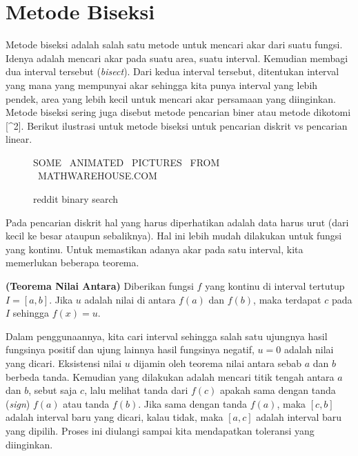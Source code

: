     \hypertarget{metode-biseksi}{%
\section{Metode Biseksi}\label{metode-biseksi}}

    Metode biseksi adalah salah satu metode untuk mencari akar dari suatu
fungsi. Idenya adalah mencari akar pada suatu area, suatu interval.
Kemudian membagi dua interval tersebut (\emph{bisect}). Dari kedua
interval tersebut, ditentukan interval yang mana yang mempunyai akar
sehingga kita punya interval yang lebih pendek, area yang lebih kecil
untuk mencari akar persamaan yang diinginkan. Metode biseksi sering juga
disebut metode pencarian biner atau metode dikotomi {[}\^{}2{]}. Berikut
ilustrasi untuk metode biseksi untuk pencarian diskrit vs pencarian
linear.

\begin{figure}
\centering
SOME \ ANIMATED \ PICTURES \ FROM \ MATHWAREHOUSE.COM
\caption{reddit binary search}
\end{figure}

Pada pencarian diskrit hal yang harus diperhatikan adalah data harus
urut (dari kecil ke besar ataupun sebaliknya). Hal ini lebih mudah
dilakukan untuk fungsi yang kontinu. Untuk memastikan adanya akar pada
satu interval, kita memerlukan beberapa teorema.

\noindent \textbf{(Teorema Nilai Antara)} Diberikan fungsi \(f\) yang kontinu di
interval tertutup \(I=[a,b]\). Jika \(u\) adalah nilai di antara
\(f(a)\) dan \(f(b)\), maka terdapat \(c\) pada \(I\) sehingga
\(f(x) = u\).




Dalam penggunaannya, kita cari interval sehingga salah satu ujungnya
hasil fungsinya positif dan ujung lainnya hasil fungsinya negatif,
\(u=0\) adalah nilai yang dicari. Eksistensi nilai \(u\) dijamin oleh
teorema nilai antara sebab \(a\) dan \(b\) berbeda tanda. Kemudian yang
dilakukan adalah mencari titik tengah antara \(a\) dan \(b\), sebut saja
\(c\), lalu melihat tanda dari \(f(c)\) apakah sama dengan tanda
(\emph{sign}) \(f(a)\) atau tanda \(f(b)\). Jika sama dengan tanda
\(f(a)\), maka \([c,b]\) adalah interval baru yang dicari, kalau tidak,
maka \([a,c]\) adalah interval baru yang dipilih. Proses ini diulangi
sampai kita mendapatkan toleransi yang diinginkan.


